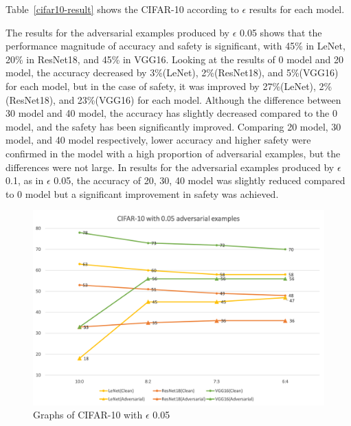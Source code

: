 \documentclass[journal,article,submit,moreauthors,pdftex]{Definitions/mdpi}
\begin{document}
Table~\ref{cifar10-result} shows the CIFAR-10 according to \begin{math}\epsilon\end{math} results for each model.

The results for the adversarial examples produced by \begin{math}\epsilon\end{math} 0.05 shows that the performance magnitude of accuracy and safety is significant, with 45\%  in LeNet, 20\% in ResNet18, and 45\% in VGG16.
Looking at the results of 0 model and 20 model, the accuracy decreased by 3\%(LeNet), 2\%(ResNet18), and 5\%(VGG16) for each model, but in the case of safety, it was improved by 27\%(LeNet), 2\%(ResNet18), and 23\%(VGG16) for each model.
Although the difference between 30 model and 40 model, the accuracy has slightly decreased compared to the 0 model, and the safety has been significantly improved.
Comparing 20 model, 30 model, and 40 model respectively, lower accuracy and higher safety were confirmed in the model with a high proportion of adversarial examples, but the differences were not large.
In results for the adversarial examples produced by \begin{math}\epsilon\end{math} 0.1, as in \begin{math}\epsilon\end{math} 0.05, the accuracy of 20, 30, 40 model was slightly reduced compared to 0 model but a significant improvement in safety was achieved.

\begin{figure}[H]
    \includegraphics[width=13 cm]{Definitions/graph-005cifar10.png}
    \caption{Graphs of CIFAR-10 with \begin{math}\epsilon\end{math} 0.05\label{cifar10-0.05-graph}}
\end{figure}
\end{document}
